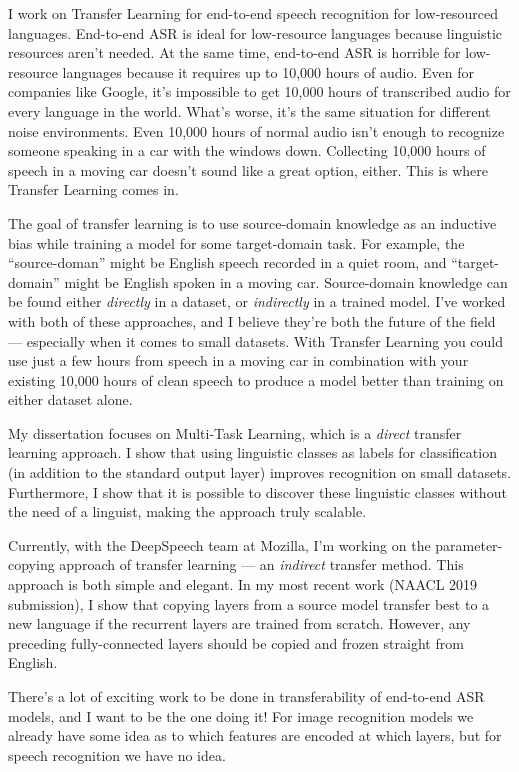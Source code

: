 \documentclass[12pt,a4paper]{article}
\begin{document}
I work on Transfer Learning for end-to-end speech recognition for low-resourced languages. End-to-end ASR is ideal for low-resource languages because linguistic resources aren't needed. At the same time, end-to-end ASR is horrible for low-resource languages because it requires up to 10,000 hours of audio. Even for companies like Google, it's impossible to get 10,000 hours of transcribed audio for every language in the world. What's worse, it's the same situation for different noise environments. Even 10,000 hours of normal audio isn't enough to recognize someone speaking in a car with the windows down. Collecting 10,000 hours of speech in a moving car doesn't sound like a great option, either. This is where Transfer Learning comes in.

The goal of transfer learning is to use source-domain knowledge as an inductive bias while training a model for some target-domain task. For example, the ``source-doman'' might be English speech recorded in a quiet room, and ``target-domain'' might be English spoken in a moving car. Source-domain knowledge can be found either \textit{directly} in a dataset, or \textit{indirectly} in a trained model. I've worked with both of these approaches, and I believe they're both the future of the field --- especially when it comes to small datasets. With Transfer Learning you could use just a few hours from speech in a moving car in combination with your existing 10,000 hours of clean speech to produce a model better than training on either dataset alone.

My dissertation focuses on Multi-Task Learning, which is a \textit{direct} transfer learning approach. I show that using linguistic classes as labels for classification (in addition to the standard output layer) improves recognition on small datasets. Furthermore, I show that it is possible to discover these linguistic classes without the need of a linguist, making the approach truly scalable.

Currently, with the DeepSpeech team at Mozilla, I'm working on the parameter-copying approach of transfer learning --- an \textit{indirect} transfer method. This approach is both simple and elegant. In my most recent work (NAACL 2019 submission), I show that copying layers from a source model transfer best to a new language if the recurrent layers are trained from scratch. However, any preceding fully-connected layers should be copied and frozen straight from English.

There's a lot of exciting work to be done in transferability of end-to-end ASR models, and I want to be the one doing it! For image recognition models we already have some idea as to which features are encoded at which layers, but for speech recognition we have no idea.
\end{document}
